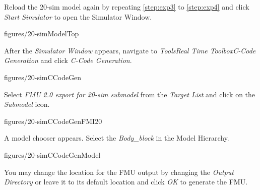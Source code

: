 \documentclass[11pt,a4paper]{../tutorial}
\begin{document}
\begin{instructions}

\item \label{step:exp1} Reload the 20-sim model again by repeating \ref{step:exp3} to \ref{step:exp4} and click \emph{Start Simulator} to open the Simulator Window.

    \begin{annotation}[width=0.8\linewidth]{figures/20-simModelTop}
    \end{annotation}

\newpage

\item After the \emph{Simulator Window} appears, navigate to \emph{Tools\menusep Real Time Toolbox\menusep C-Code Generation} and click \emph{C-Code Generation}.

   \begin{annotation}[width=0.8\linewidth]{figures/20-simCCodeGen}
    \end{annotation}

\item Select \emph{FMU 2.0 export for 20-sim submodel} from the \emph{Target List} and click on the \emph{Submodel} icon.

   \begin{annotation}[width=0.5\linewidth]{figures/20-simCCodeGenFMI20}
	   
   \end{annotation}

\newpage

\item A model chooser appears. Select the \emph{Body\_block} in the Model Hierarchy. 

   \begin{annotation}[width=0.5\linewidth]{figures/20-simCCodeGenModel}
   \end{annotation}

\item You may change the location for the FMU output by changing the \emph{Output Directory} or leave it to its default location and click \emph{OK} to generate the FMU. 


\end{instructions}
\end{document}
